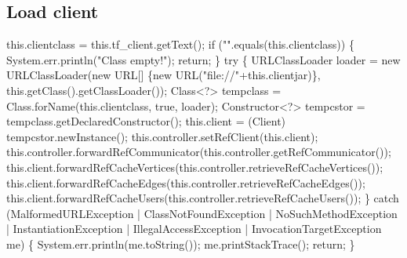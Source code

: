 \subsection{Load client}
\nwenddocs{}\endmoddef{}
this.clientclass = this.tf_client.getText();
if ("".equals(this.clientclass)) \{
  System.err.println("Class empty!");
  return;
\}
try \{
  URLClassLoader loader = new URLClassLoader(new URL[] \{new URL("file://"+this.clientjar)\},
      this.getClass().getClassLoader());
  Class<?> tempclass = Class.forName(this.clientclass, true, loader);
  Constructor<?> tempcstor = tempclass.getDeclaredConstructor();
  this.client = (Client) tempcstor.newInstance();
  this.controller.setRefClient(this.client);
  this.controller.forwardRefCommunicator(this.controller.getRefCommunicator());
  this.client.forwardRefCacheVertices(this.controller.retrieveRefCacheVertices());
  this.client.forwardRefCacheEdges(this.controller.retrieveRefCacheEdges());
  this.client.forwardRefCacheUsers(this.controller.retrieveRefCacheUsers());
\} catch (MalformedURLException
    | ClassNotFoundException
    | NoSuchMethodException
    | InstantiationException
    | IllegalAccessException
    | InvocationTargetException me) \{
  System.err.println(me.toString());
  me.printStackTrace();
  return;
\}
\nwendcode{}\nwdocspar

